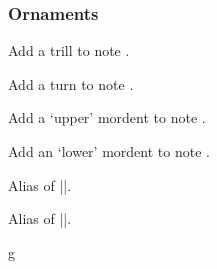\subsubsection{Ornaments}\label{sec:music-notes:misc:ornaments}
\begin{command}{\tmtrill{}}
  Add a trill to note .
\end{command}
\begin{command}{\tmturn{}}
  Add a turn to note .
\end{command}
\begin{command}{\tmmordent{}}
  Add a `upper' mordent to note .
\end{command}
\begin{command}{\tmmordent*{}}
  Add an `lower' mordent to note .
\end{command}
\begin{command}{\tmuppermordent{}}
  Alias of |\tmmordent|.
\end{command}
\begin{command}{\tmlowermordent{}}
  Alias of |\tmmordent*|.
\end{command}
\begin{codeexample}[]
\begin{tmline}
\begin{tmstaff}{g}{}
    
   
\end{tmstaff}
\end{tmline}
\end{codeexample}

